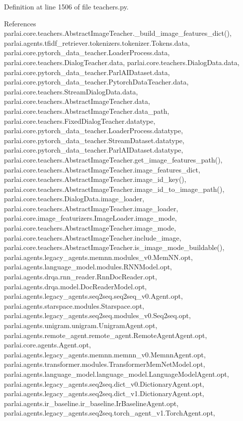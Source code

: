 Definition at line 1506 of file teachers.\+py.



References parlai.\+core.\+teachers.\+Abstract\+Image\+Teacher.\+\_\+build\+\_\+image\+\_\+features\+\_\+dict(), parlai.\+agents.\+tfidf\+\_\+retriever.\+tokenizers.\+tokenizer.\+Tokens.\+data, parlai.\+core.\+pytorch\+\_\+data\+\_\+teacher.\+Loader\+Process.\+data, parlai.\+core.\+teachers.\+Dialog\+Teacher.\+data, parlai.\+core.\+teachers.\+Dialog\+Data.\+data, parlai.\+core.\+pytorch\+\_\+data\+\_\+teacher.\+Parl\+A\+I\+Dataset.\+data, parlai.\+core.\+pytorch\+\_\+data\+\_\+teacher.\+Pytorch\+Data\+Teacher.\+data, parlai.\+core.\+teachers.\+Stream\+Dialog\+Data.\+data, parlai.\+core.\+teachers.\+Abstract\+Image\+Teacher.\+data, parlai.\+core.\+teachers.\+Abstract\+Image\+Teacher.\+data\+\_\+path, parlai.\+core.\+teachers.\+Fixed\+Dialog\+Teacher.\+datatype, parlai.\+core.\+pytorch\+\_\+data\+\_\+teacher.\+Loader\+Process.\+datatype, parlai.\+core.\+pytorch\+\_\+data\+\_\+teacher.\+Stream\+Dataset.\+datatype, parlai.\+core.\+pytorch\+\_\+data\+\_\+teacher.\+Parl\+A\+I\+Dataset.\+datatype, parlai.\+core.\+teachers.\+Abstract\+Image\+Teacher.\+get\+\_\+image\+\_\+features\+\_\+path(), parlai.\+core.\+teachers.\+Abstract\+Image\+Teacher.\+image\+\_\+features\+\_\+dict, parlai.\+core.\+teachers.\+Abstract\+Image\+Teacher.\+image\+\_\+id\+\_\+key(), parlai.\+core.\+teachers.\+Abstract\+Image\+Teacher.\+image\+\_\+id\+\_\+to\+\_\+image\+\_\+path(), parlai.\+core.\+teachers.\+Dialog\+Data.\+image\+\_\+loader, parlai.\+core.\+teachers.\+Abstract\+Image\+Teacher.\+image\+\_\+loader, parlai.\+core.\+image\+\_\+featurizers.\+Image\+Loader.\+image\+\_\+mode, parlai.\+core.\+teachers.\+Abstract\+Image\+Teacher.\+image\+\_\+mode, parlai.\+core.\+teachers.\+Abstract\+Image\+Teacher.\+include\+\_\+image, parlai.\+core.\+teachers.\+Abstract\+Image\+Teacher.\+is\+\_\+image\+\_\+mode\+\_\+buildable(), parlai.\+agents.\+legacy\+\_\+agents.\+memnn.\+modules\+\_\+v0.\+Mem\+N\+N.\+opt, parlai.\+agents.\+language\+\_\+model.\+modules.\+R\+N\+N\+Model.\+opt, parlai.\+agents.\+drqa.\+rnn\+\_\+reader.\+Rnn\+Doc\+Reader.\+opt, parlai.\+agents.\+drqa.\+model.\+Doc\+Reader\+Model.\+opt, parlai.\+agents.\+legacy\+\_\+agents.\+seq2seq.\+seq2seq\+\_\+v0.\+Agent.\+opt, parlai.\+agents.\+starspace.\+modules.\+Starspace.\+opt, parlai.\+agents.\+legacy\+\_\+agents.\+seq2seq.\+modules\+\_\+v0.\+Seq2seq.\+opt, parlai.\+agents.\+unigram.\+unigram.\+Unigram\+Agent.\+opt, parlai.\+agents.\+remote\+\_\+agent.\+remote\+\_\+agent.\+Remote\+Agent\+Agent.\+opt, parlai.\+core.\+agents.\+Agent.\+opt, parlai.\+agents.\+legacy\+\_\+agents.\+memnn.\+memnn\+\_\+v0.\+Memnn\+Agent.\+opt, parlai.\+agents.\+transformer.\+modules.\+Transformer\+Mem\+Net\+Model.\+opt, parlai.\+agents.\+language\+\_\+model.\+language\+\_\+model.\+Language\+Model\+Agent.\+opt, parlai.\+agents.\+legacy\+\_\+agents.\+seq2seq.\+dict\+\_\+v0.\+Dictionary\+Agent.\+opt, parlai.\+agents.\+legacy\+\_\+agents.\+seq2seq.\+dict\+\_\+v1.\+Dictionary\+Agent.\+opt, parlai.\+agents.\+ir\+\_\+baseline.\+ir\+\_\+baseline.\+Ir\+Baseline\+Agent.\+opt, parlai.\+agents.\+legacy\+\_\+agents.\+seq2seq.\+torch\+\_\+agent\+\_\+v1.\+Torch\+Agent.\+opt, 